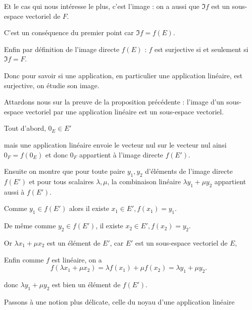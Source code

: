 Et le cas qui nous intéresse le plus, c'est l'image : on a aussi que $\Im f$ est un sous-espace vectoriel de $F$.

C'est un conséquence du premier point car $\Im f = f(E)$.

\change

Enfin par définition de l'image directe $f(E)$ : 
$f$ est surjective si et seulement si $\Im f =F$.

Donc pour savoir si une application, en particulier une application linéaire, est surjective, on étudie son image.



\diapo

Attardons nous sur la preuve de la proposition précédente :
l'image d'un sous-espace vectoriel par une application linéaire est un sous-espace vectoriel.

\change


Tout d'abord, $0_{E} \in E'$  

mais une application linéaire envoie le vecteur nul sur le vecteur nul ainsi
$0_{F} = f(0_{E})$ et donc $0_{F}$ appartient à l'image directe $f(E')$.

\change


Ensuite on montre que pour toute paire $y_1,y_2$ d'éléments de l'image directe $f(E')$
et pour tous scalaires $\lambda,\mu$, la combinaison linéaire $\lambda y_1 + \mu y_2$ appartient aussi à $f(E')$.

\change

Comme $y_1 \in f(E')$ alors il existe $x_1\in E' , f(x_1)=y_1$.

\change

De même comme $y_2 \in f(E')$, il existe $x_2\in E' , f(x_2)=y_2$.

\change

Or $\lambda x_1 + \mu x_2$ est un élément de $E'$, car $E'$ est un 
sous-espace vectoriel de $E$,

\change

Enfin comme $f$ est linéaire, on a 
$$f(\lambda x_1+ \mu x_2)=\lambda f(x_1)+ \mu f(x_2)=\lambda y_1 + \mu y_2.$$

\change

donc $\lambda y_1 + \mu y_2$ est bien un élément de $f(E')$.

\diapo

Passons à une notion plus délicate, celle du noyau d'une application linéaire

